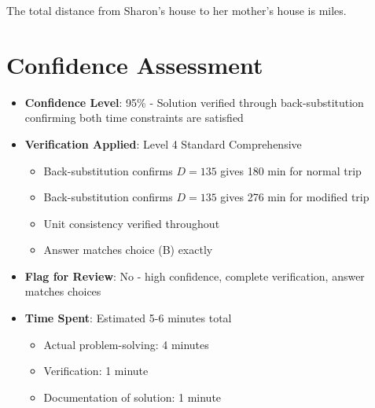\documentclass[11pt]{article}
\begin{document}
The total distance from Sharon's house to her mother's house is  miles.

\section*{Confidence Assessment}
\begin{itemize}[leftmargin=*]
    \item \textbf{Confidence Level}: 95\% - Solution verified through back-substitution confirming both time constraints are satisfied
    
    \item \textbf{Verification Applied}: Level 4 Standard Comprehensive
    \begin{itemize}[leftmargin=*]
        \item Back-substitution confirms $D = 135$ gives 180 min for normal trip
        \item Back-substitution confirms $D = 135$ gives 276 min for modified trip
        \item Unit consistency verified throughout
        \item Answer matches choice (B) exactly
    \end{itemize}
    
    \item \textbf{Flag for Review}: No - high confidence, complete verification, answer matches choices
    
    \item \textbf{Time Spent}: Estimated 5-6 minutes total
    \begin{itemize}[leftmargin=*]
        \item Actual problem-solving: 4 minutes
        \item Verification: 1 minute
        \item Documentation of solution: 1 minute
    \end{itemize}
\end{itemize}
\end{document}
